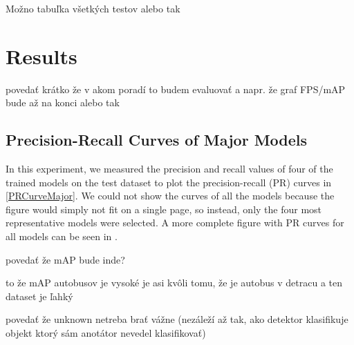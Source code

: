 Možno tabuľka všetkých testov alebo tak















\chapter{Results}
\label{Results}
povedať krátko že v akom poradí to budem evaluovať a napr. že graf FPS/mAP bude až na konci alebo tak








\section{Precision-Recall Curves of Major Models}







In this experiment, we measured the precision and recall values of four of the
trained models on the test dataset to plot the precision-recall (PR) curves in
\autoref{PRCurveMajor}.  We could not show the curves of all the models because
the figure would simply not fit on a single page, so instead, only the four most
representative models were selected. A more complete figure with PR curves for
all models can be seen in .

povedať že mAP bude inde?

to že mAP autobusov je vysoké je asi kvôli tomu, že je autobus v detracu a ten dataset je ľahký

povedať že unknown netreba brať vážne (nezáleží až tak, ako detektor klasifikuje objekt ktorý sám anotátor nevedel klasifikovať)

